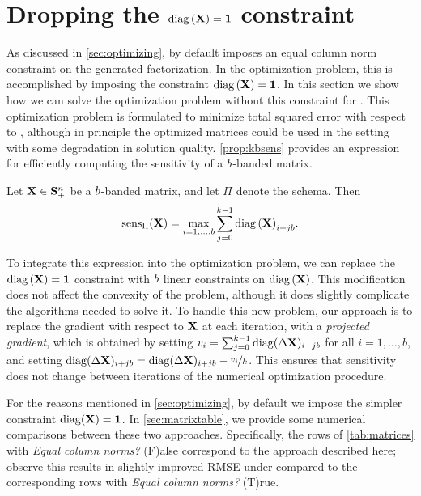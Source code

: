 \documentclass{article}
\begin{document}
\section{Dropping the $\operatorname{diag}{(\mathbf{X})}=\mathbf{1}$ constraint}\label{sec:dropx1}
As discussed in \cref{sec:optimizing}, \BANDMF by default imposes an equal column norm constraint on the generated factorization.  In the optimization problem, this is accomplished by imposing the constraint $\operatorname{diag}{(\mathbf{X})} = \mathbf{1}$.  In this section we show how we can solve the optimization problem without this constraint for \multiepochpart.  This optimization problem is formulated to minimize total squared error with respect to \multiepochpart,
although in principle the optimized matrices could be used in the \bparticipation setting with some degradation in solution quality.  \cref{prop:kbsens} provides an expression for efficiently computing the sensitivity of a $b$-banded matrix.

\begin{prop} \label{prop:kbsens}
Let $\mathbf{X} \in \mathbf{S}_+^n$ be a $b$-banded matrix, and let $\Pi$ denote the \multiepochpart schema.  Then 
 $$\operatorname{sens}_{\Pi}(\mathbf{X}) = \max_{i=1, \dots, b} \sum_{j=0}^{k-1} \operatorname{diag}{(\mathbf{X})}_{i+j b}.$$
\end{prop}

To integrate this expression into the optimization problem, we can replace the $\operatorname{diag}{(\mathbf{X})} = \mathbf{1}$ constraint with $b$ linear constraints on $\operatorname{diag}{(\mathbf{X})}$.  This modification does not affect the convexity of the problem, although it does slightly complicate the algorithms needed to solve it.  To handle this new problem, our approach is to replace the gradient with respect to $\mathbf{X}$ at each iteration, with a \emph{projected gradient}, which is obtained by setting $v_i = \sum_{j=0}^{k-1} \operatorname{diag}(\Delta \mathbf{X})_{i + jb}$ for all $i = 1, \dots, b$, and setting $\operatorname{diag}(\Delta \mathbf{X})_{i + jb} = \operatorname{diag}(\Delta \mathbf{X})_{i + jb} - \nicefrac{v_i}{k}$.  This ensures that sensitivity does not change between iterations of the numerical optimization procedure.

For the reasons mentioned in \cref{sec:optimizing}, by default we impose the simpler constraint $\operatorname{diag}(\mathbf{X}) = \mathbf{1}$.  In \cref{sec:matrixtable}, we provide some numerical comparisons between these two approaches. Specifically, the rows of \cref{tab:matrices} with \emph{Equal column norms?} (F)alse correspond to the approach described here; observe this results in slightly improved RMSE under \multiepochpart compared to the corresponding rows with \emph{Equal column norms?} (T)rue.
\end{document}
